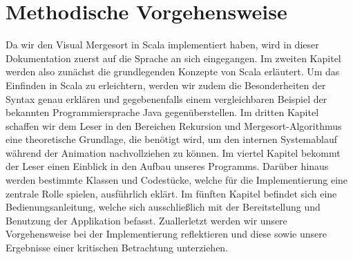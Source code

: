 \section{Methodische Vorgehensweise}
Da wir den Visual Mergesort in Scala implementiert haben, wird in dieser Dokumentation zuerst auf die Sprache an sich eingegangen. Im zweiten Kapitel werden also zunächst die grundlegenden Konzepte von Scala erläutert. Um das Einfinden in Scala zu erleichtern, werden wir zudem die Besonderheiten der Syntax genau erklären und gegebenenfalls einem vergleichbaren Beispiel der bekannten Programmiersprache Java gegenüberstellen. Im dritten Kapitel schaffen wir dem Leser in den Bereichen Rekursion und Mergesort-Algorithmus eine theoretische Grundlage, die benötigt wird, um den internen Systemablauf während der Animation nachvollziehen zu können. Im viertel Kapitel bekommt der Leser einen Einblick in den Aufbau unseres Programms. Darüber hinaus werden bestimmte Klassen und Codestücke, welche für die Implementierung eine zentrale Rolle spielen, ausführlich eklärt. Im fünften Kapitel befindet sich eine Bedienungsanleitung, welche sich ausschließlich mit der Bereitstellung und Benutzung der Applikation befasst. Zuallerletzt werden wir unsere Vorgehensweise bei der Implementierung reflektieren und diese sowie unsere Ergebnisse einer kritischen Betrachtung unterziehen.
